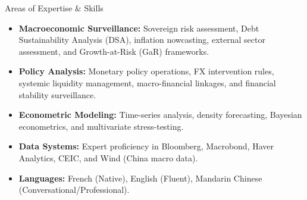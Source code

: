 \documentclass[usegeometry, 10pt, a4paper]{cv} %
\begin{document}
\begin{rubriquetableau}[0.98\textwidth]{Areas of Expertise \& Skills}
  \vspace{-0.5cm}  
  \begin{itemize}
    \item \textbf{Macroeconomic Surveillance:} Sovereign risk assessment, Debt Sustainability Analysis (DSA), inflation nowcasting, external sector assessment, and Growth-at-Risk (GaR) frameworks.
    \item \textbf{Policy Analysis:} Monetary policy operations, FX intervention rules, systemic liquidity management, macro-financial linkages, and financial stability surveillance.
    \item \textbf{Econometric Modeling:} Time-series analysis, density forecasting, Bayesian econometrics, and multivariate stress-testing.
    \item \textbf{Data Systems:} Expert proficiency in Bloomberg, Macrobond, Haver Analytics, CEIC, and Wind (China macro data).
    \item \textbf{Languages:} French (Native), English (Fluent), Mandarin Chinese (Conversational/Professional).
  \end{itemize}
  \end{rubriquetableau}

\end{document}
